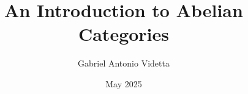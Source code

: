\documentclass{beamer}
\title{An Introduction to Abelian Categories}
\author{Gabriel Antonio Videtta}
\date{May 2025}
\begin{document}
\begin{frame}
    \titlepage
\end{frame}
\end{document}

